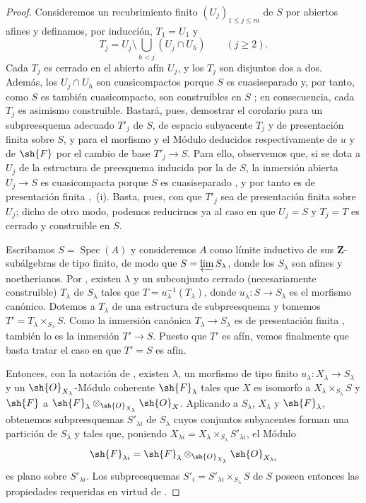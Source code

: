\begin{proof}
Consideremos un recubrimiento finito $(U_j)_{1\leqslant j\leqslant m}$ de $S$ por abiertos afines y definamos, por inducción, $T_1=U_1$ y
\[
T_j=U_j\setminus\bigcup_{h<j}(U_j\cap U_h)\qquad(j\geqslant 2).
\]
Cada $T_j$ es cerrado en el abierto afín $U_j$, y los $T_j$ son disjuntos dos a dos.
Además, los $U_j\cap U_h$ son cuasicompactos porque $S$ es cuasiseparado y, por tanto, como $S$ es también cuasicompacto, son construibles en $S$ ; en consecuencia, cada $T_j$ es asimismo construible.
Bastará, pues, demostrar el corolario para un subpreesquema adecuado $T'_j$ de $S$, de espacio subyacente $T_j$ y de presentación finita sobre $S$, y para el morfismo y el Módulo deducidos respectivamente de $u$ y de $\sh{F}$ por el cambio de base $T'_j\to S$.
Para ello, observemos que, si se dota a $U_j$ de la estructura de preesquema inducida por la de $S$, la inmersión abierta $U_j\to S$ es cuasicompacta porque $S$ es cuasiseparado , y por tanto es de
presentación finita ,~(i).
Basta, pues, con que $T'_j$ sea de presentación finita sobre $U_j$; dicho de otro modo, podemos reducirnos ya al caso en que $U_j=S$ y $T_j=T$ es cerrado y construible en $S$.

Escribamos $S=\operatorname{Spec}(A)$ y consideremos $A$ como límite inductivo de sus $\mathbf{Z}$-subálgebras de tipo finito, de modo que $S=\varprojlim S_\lambda$, donde los $S_\lambda$ son afines y noetherianos.
Por , existen $\lambda$ y un subconjunto cerrado (necesariamente construible) $T_\lambda$ de $S_\lambda$ tales que $T=u_\lambda^{-1}(T_\lambda)$, donde $u_\lambda:S\to S_\lambda$ es el morfismo canónico.
Dotemos a $T_\lambda$ de una estructura de subpreesquema y tomemos $T'=T_\lambda\times_{S_\lambda}S$.
Como la inmersión canónica $T_\lambda\to S_\lambda$ es de presentación finita , también lo es la inmersión $T'\to S$.
Puesto que $T'$ es afín, vemos finalmente que basta tratar el caso en que $T'=S$ es afín.

Entonces, con la notación de , existen $\lambda$, un morfismo de tipo finito $u_\lambda:X_\lambda\to S_\lambda$ y un $\sh{O}_{X_\lambda}$-Módulo coherente $\sh{F}_\lambda$ tales que $X$ es isomorfo a $X_\lambda\times_{S_\lambda}S$ y $\sh{F}$ a $\sh{F}_\lambda\otimes_{\sh{O}_{X_\lambda}}\sh{O}_X$.
Aplicando  a $S_\lambda$, $X_\lambda$ y $\sh{F}_\lambda$, obtenemos subpreesquemas $S'_{\lambda i}$ de $S_\lambda$ cuyos conjuntos subyacentes forman una partición de $S_\lambda$ y tales que, poniendo $X_{\lambda i}=X_\lambda\times_{S_\lambda}S'_{\lambda i}$, el Módulo
\[
\sh{F}_{\lambda i}=\sh{F}_\lambda\otimes_{\sh{O}_{X_\lambda}}\sh{O}_{X_{\lambda i}}
\]
es plano sobre $S'_{\lambda i}$.
Los subpreesquemas $S'_i=S'_{\lambda i}\times_{S_\lambda}S$ de $S$ poseen entonces las propiedades requeridas en virtud de .
\end{proof}

